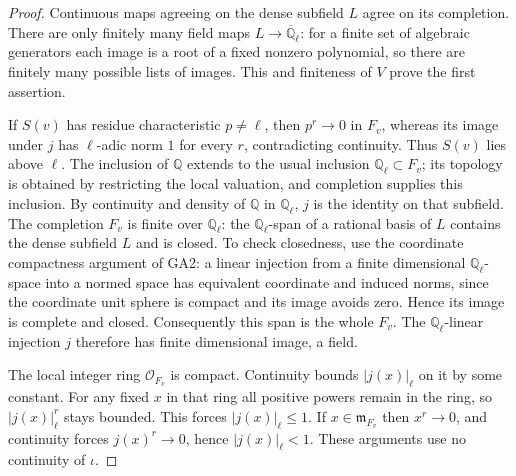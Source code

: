 \begin{proof}
Continuous maps agreeing on the dense subfield $L$ agree on its
completion.  There are only finitely many field maps
$L\to\overline{\mathbb Q}_\ell$: for a finite set of algebraic
generators each image is a root of a fixed nonzero polynomial,
so there are finitely many possible lists of images.  This and
finiteness of $V$ prove the first assertion.

If $S(v)$ has residue characteristic $p\ne\ell$, then
$p^r\to0$ in $F_v$, whereas its image under $j$ has
$\ell$-adic norm $1$ for every $r$, contradicting continuity.
Thus $S(v)$ lies above $\ell$.  The inclusion of $\mathbb Q$
extends to the usual inclusion $\mathbb Q_\ell\subset F_v$;
its topology is obtained by restricting the local valuation,
and completion supplies this inclusion.  By continuity and
density of $\mathbb Q$ in $\mathbb Q_\ell$, $j$ is the identity
on that subfield.  The completion $F_v$ is finite over
$\mathbb Q_\ell$: the $\mathbb Q_\ell$-span of a rational
basis of $L$ contains the dense subfield $L$ and is closed.
To check closedness, use the coordinate compactness argument
of GA2: a linear injection from a finite dimensional
$\mathbb Q_\ell$-space into a normed space has equivalent
coordinate and induced norms, since the coordinate unit
sphere is compact and its image avoids zero.  Hence its
image is complete and closed.  Consequently this span is
the whole $F_v$.  The $\mathbb Q_\ell$-linear injection $j$
therefore has finite dimensional image, a field.

The local integer ring $\mathcal O_{F_v}$ is compact.
Continuity bounds $|j(x)|_\ell$ on it by some constant.
For any fixed $x$ in that ring all positive powers remain
in the ring, so $|j(x)|_\ell^r$ stays bounded.  This forces
$|j(x)|_\ell\leq1$.  If $x\in\mathfrak m_{F_v}$ then
$x^r\to0$, and continuity forces $j(x)^r\to0$, hence
$|j(x)|_\ell<1$.  These arguments use no continuity of
$\iota$.
\end{proof}


